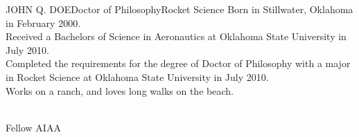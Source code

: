 \newpage
\begin{vita}{JOHN Q. DOE}{Doctor of Philosophy}{Rocket Science} %
	 Born in Stillwater, Oklahoma in February 2000.             
	 \\ Received a Bachelors of Science in Aeronautics at Oklahoma State University in July 2010. \\
Completed the requirements for the degree of Doctor of Philosophy with a major in Rocket Science at Oklahoma State University in July 2010.
	 \\ Works on a ranch, and loves long walks on the beach.

	 \\ Fellow AIAA 
\end{vita}
